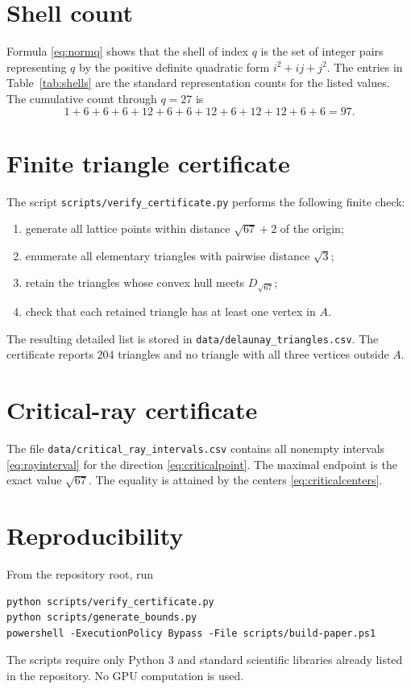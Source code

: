 \documentclass[11pt]{article}
\theoremstyle{definition}
\begin{document}
\appendix

\section{Shell count}

Formula \eqref{eq:normq} shows that the shell of index $q$ is the set
of integer pairs representing $q$ by the positive definite quadratic
form $i^2+ij+j^2$.  The entries in Table~\ref{tab:shells} are the
standard representation counts for the listed values.  The cumulative
count through $q=27$ is
\[
  1+6+6+6+12+6+6+12+6+12+12+6+6=97.
\]

\section{Finite triangle certificate}

The script \texttt{scripts/verify\_certificate.py} performs the
following finite check:
\begin{enumerate}[label=\arabic*.]
  \item generate all lattice points within distance
        $\sqrt{67}+2$ of the origin;
  \item enumerate all elementary triangles with pairwise distance
        $\sqrt3$;
  \item retain the triangles whose convex hull meets
        $D_{\sqrt{67}}$;
  \item check that each retained triangle has at least one vertex in
        $A$.
\end{enumerate}
The resulting detailed list is stored in
\texttt{data/delaunay\_triangles.csv}.  The certificate reports $204$
triangles and no triangle with all three vertices outside $A$.

\section{Critical-ray certificate}

The file \texttt{data/critical\_ray\_intervals.csv} contains all
nonempty intervals \eqref{eq:rayinterval} for the direction
\eqref{eq:criticalpoint}.  The maximal endpoint is the exact value
$\sqrt{67}$.  The equality is attained by the centers
\eqref{eq:criticalcenters}.

\section{Reproducibility}

From the repository root, run
\begin{verbatim}
python scripts/verify_certificate.py
python scripts/generate_bounds.py
powershell -ExecutionPolicy Bypass -File scripts/build-paper.ps1
\end{verbatim}
The scripts require only Python 3 and standard scientific libraries
already listed in the repository.  No GPU computation is used.



\end{document}
